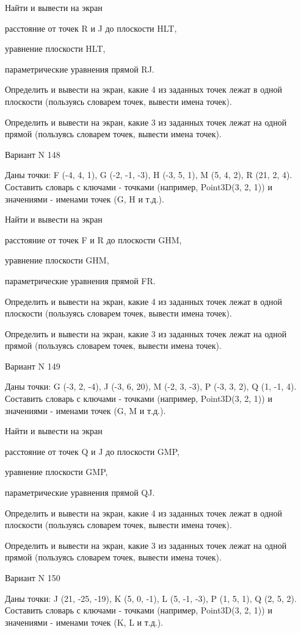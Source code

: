 \documentclass[11pt]{report}
\begin{document}
 
Найти и вывести на экран


расстояние от точек R и J до плоскости HLT,

 
уравнение плоскости HLT,

 
параметрические уравнения прямой RJ.


Определить и вывести на экран, какие 4 из заданных точек лежат в одной плоскости (пользуясь словарем точек, вывести имена точек).


Определить и вывести на экран, какие 3 из заданных точек лежат на одной прямой (пользуясь словарем точек, вывести имена точек).

Вариант N 148

Даны точки: F (-4, 4, 1), G (-2, -1, -3), H (-3, 5, 1), M (5, 4, 2), R (21, 2, 4).
Составить словарь с ключами - точками (например, Point3D(3, 2, 1)) и значениями - именами точек (G, H и т.д.).

 
Найти и вывести на экран


расстояние от точек F и R до плоскости GHM,

 
уравнение плоскости GHM,

 
параметрические уравнения прямой FR.


Определить и вывести на экран, какие 4 из заданных точек лежат в одной плоскости (пользуясь словарем точек, вывести имена точек).


Определить и вывести на экран, какие 3 из заданных точек лежат на одной прямой (пользуясь словарем точек, вывести имена точек).

Вариант N 149

Даны точки: G (-3, 2, -4), J (-3, 6, 20), M (-2, 3, -3), P (-3, 3, 2), Q (1, -1, 4).
Составить словарь с ключами - точками (например, Point3D(3, 2, 1)) и значениями - именами точек (G, M и т.д.).

 
Найти и вывести на экран


расстояние от точек Q и J до плоскости GMP,

 
уравнение плоскости GMP,

 
параметрические уравнения прямой QJ.


Определить и вывести на экран, какие 4 из заданных точек лежат в одной плоскости (пользуясь словарем точек, вывести имена точек).


Определить и вывести на экран, какие 3 из заданных точек лежат на одной прямой (пользуясь словарем точек, вывести имена точек).

Вариант N 150

Даны точки: J (21, -25, -19), K (5, 0, -1), L (5, -1, -3), P (1, 5, 1), Q (2, 5, 2).
Составить словарь с ключами - точками (например, Point3D(3, 2, 1)) и значениями - именами точек (K, L и т.д.).
\end{document}
